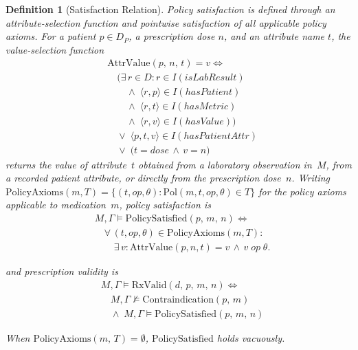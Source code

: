 \documentclass[journal]{IEEEtran}
\newtheorem{definition}{Definition}
\begin{document}
\begin{definition}[Satisfaction Relation]
Policy satisfaction is defined through an attribute-selection
function and pointwise satisfaction of all applicable policy
axioms. For a patient $p \in D_P$, a prescription dose $n$,
and an attribute name $t$, the value-selection function
\begin{equation}
\begin{aligned}
& \mathrm{AttrValue}(p,\, n,\, t) = v \iff \\
& \quad \bigl( \exists\, r \in D :
    r \in I(\mathit{isLabResult}) \\
& \qquad \wedge\; \langle r, p \rangle \in I(\mathit{hasPatient}) \\
& \qquad \wedge\; \langle r, t \rangle \in I(\mathit{hasMetric}) \\
& \qquad \wedge\; \langle r, v \rangle \in I(\mathit{hasValue}) \bigr) \\
& \quad \vee\;
    \langle p, t, v \rangle \in I(\mathit{hasPatientAttr}) \\
& \quad \vee\;
    \bigl( t = \mathit{dose}\, \wedge\, v = n \bigr)
\end{aligned}
\label{eq:attr-value}
\end{equation}
returns the value of attribute~$t$ obtained from a laboratory
observation in~$M$, from a recorded patient attribute, or
directly from the prescription dose~$n$.
Writing $\mathrm{PolicyAxioms}(m, T) =
\{ (t, \mathit{op}, \theta) :
   \mathrm{Pol}(m, t, \mathit{op}, \theta) \in T \}$
for the policy axioms applicable to medication~$m$, policy
satisfaction is
\begin{equation}
\begin{aligned}
& M, \Gamma \models \mathrm{PolicySatisfied}(p,\, m,\, n) \iff \\
& \quad \forall\, (t, \mathit{op}, \theta) \in
    \mathrm{PolicyAxioms}(m, T): \\
& \qquad \exists\, v :
    \mathrm{AttrValue}(p, n, t) = v
    \,\wedge\, v\;\mathit{op}\;\theta.
\end{aligned}
\label{eq:policy-sat}
\end{equation}

and prescription validity is
\begin{equation}
\begin{aligned}
  & M, \Gamma \models \mathrm{RxValid}(d,\, p,\, m,\, n) \iff \\
  & \quad M, \Gamma \not\models \mathrm{Contraindication}(p,\, m) \\
  & \quad \wedge\; M, \Gamma \models \mathrm{PolicySatisfied}(p,\, m,\, n)
\end{aligned}
\label{eq:rx-valid}
\end{equation}

When $\mathrm{PolicyAxioms}(m,\, T)=\emptyset$, $\mathrm{PolicySatisfied}$ holds vacuously.

\end{definition}
\end{document}
